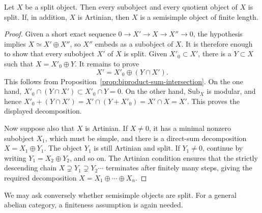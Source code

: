 \begin{proposition}
	Let $X$ be a split object. Then every subobject and every quotient object of
	$X$ is split. If, in addition, $X$ is Artinian, then $X$ is a semisimple
	object of finite length.
\end{proposition}
\begin{proof}
	Given a short exact sequence $0\to X'\to X\to X''\to0$, the hypothesis
	implies $X\simeq X'\oplus X''$, so $X''$ embeds as a subobject of $X$.
	It is therefore enough to show that every subobject $X'$ of $X$ is split.
	Given $X'_0\subset X'$, there is a $Y\subset X$ such that
	$X=X'_0\oplus Y$. It remains to prove
	\[ X'=X'_0\oplus(Y\cap X'). \]
	This follows from Proposition~\ref{prop:biproduct-sum-intersection}. On the
	one hand, $X'_0\cap(Y\cap X')\subset X'_0\cap Y=0$. On the other hand,
	$\mathrm{Sub}_X$ is modular, and hence
	$X'_0+(Y\cap X')=X'\cap(Y+X'_0)=X'\cap X=X'$. This proves the displayed
	decomposition.

	Now suppose also that $X$ is Artinian. If $X\neq0$, it has a minimal
	nonzero subobject $X_1$, which must be simple, and there is a direct-sum
	decomposition $X=X_1\oplus Y_1$. The object $Y_1$ is still Artinian and
	split. If $Y_1\neq0$, continue by writing $Y_1=X_2\oplus Y_2$, and so on.
	The Artinian condition ensures that the strictly descending chain
	$X\supsetneq Y_1\supsetneq Y_2\cdots$ terminates after finitely
	many steps, giving the required decomposition
	$X=X_1\oplus\cdots\oplus X_n$.
\end{proof}

We may ask conversely whether semisimple objects are split. For a general
abelian category, a finiteness assumption is again needed.

